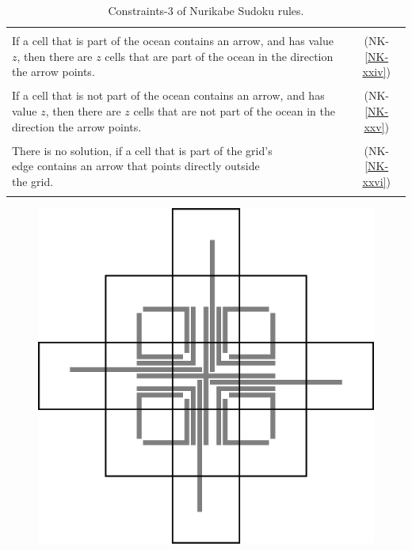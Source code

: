 \begin{table}
    \centering
    \begin{tabular*}{\textwidth}{l @{\extracolsep{\fill}} c}
        \hline
        \\
        \makecell[cl]{If a cell that is part of the ocean contains an arrow,\\
        and has value $z$, then there are $z$ cells that are part\\
        of the ocean in the direction the arrow points.} & (NK-\ref{NK-xxiv})\\
        \\
        \makecell[cl]{If a cell that is not part of the ocean contains an\\
        arrow, and has value $z$, then there are $z$ cells that are\\
        not part of the ocean in the direction the arrow points.} & (NK-\ref{NK-xxv})\\
        \\
        \makecell[cl]{There is no solution, if a cell that is part of the grid's\\
        edge contains an arrow that points directly outside\\
        the grid.} & (NK-\ref{NK-xxvi})\\
        \\
        \hline
    \end{tabular*}
        \caption{Constraints-3 of Nurikabe Sudoku rules.}
    \label{Constraints:NurikabeSudoku3}
\end{table}

\begin{figure}
\centering

  \centering
  \includegraphics[width=.5\textwidth]{Figures/ConstelationsBW.png}
  \captionsetup{justification=centering,margin=0cm}
  \label{fig:Constellations}

\end{figure}

